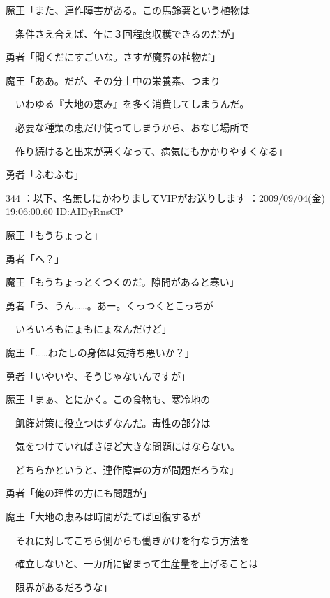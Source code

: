 \documentclass[a4j,twocolumn]{tarticle}
\begin{document}
魔王「また、連作障害がある。この馬鈴薯という植物は\par{} 
　条件さえ合えば、年に３回程度収穫できるのだが」 



勇者「聞くだにすごいな。さすが魔界の植物だ」 



魔王「ああ。だが、その分土中の栄養素、つまり\par{} 
　いわゆる『大地の恵み』を多く消費してしまうんだ。\par{} 
　必要な種類の恵だけ使ってしまうから、おなじ場所で\par{} 
　作り続けると出来が悪くなって、病気にもかかりやすくなる」 



勇者「ふむふむ」 

	
    
    

344 ：以下、名無しにかわりましてVIPがお送りします ：2009/09/04(金) 19:06:00.60 ID:AIDyRnsCP 


魔王「もうちょっと」\par{} 
勇者「へ？」 



魔王「もうちょっとくつくのだ。隙間があると寒い」 



勇者「う、うん……。あー。くっつくとこっちが\par{} 
　いろいろもにょもにょなんだけど」 



魔王「……わたしの身体は気持ち悪いか？」\par{} 
勇者「いやいや、そうじゃないんですが」 



魔王「まぁ、とにかく。この食物も、寒冷地の\par{} 
　飢饉対策に役立つはずなんだ。毒性の部分は \par{}
　気をつけていればさほど大きな問題にはならない。\par{} 
　どちらかというと、連作障害の方が問題だろうな」 



勇者「俺の理性の方にも問題が」 



魔王「大地の恵みは時間がたてば回復するが\par{} 
　それに対してこちら側からも働きかけを行なう方法を\par{} 
　確立しないと、一カ所に留まって生産量を上げることは\par{} 
　限界があるだろうな」 
\end{document}
